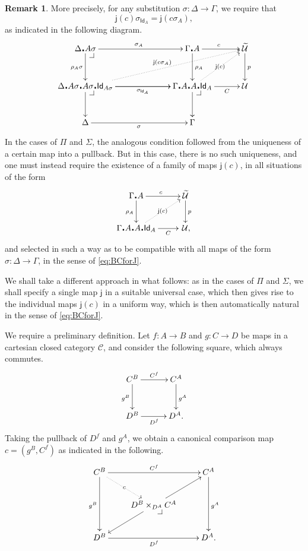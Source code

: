 \documentclass[12pt]{article}
\makeatletter
\newcommand{\pbcorner}[1][dr]{\save*!/#1-1.2pc/#1:(-1,1)@^{|-}\restore}
\newcommand{\G}{\ensuremath{\Gamma}}
\newcommand{\exdot}{\ensuremath{\!\centerdot\!}}
\newcommand{\Id}{\mathsf{Id}}
\newcommand{\jay}{\mathsf{j}}
\newcommand{\U}{\ensuremath{\mathcal{U}}}
\newcommand{\UU}{\ensuremath{\widetilde{\mathcal{U}}}}
\theoremstyle{definition}
\newtheorem{remark}[theorem]{Remark}
\makeatother
\begin{document}
\begin{remark}
More precisely, for any substitution $\sigma :\Delta\to \G$, we require that 
%
\begin{equation}\label{eq:BCforJ}
\jay(c)\sigma_{\Id_{A}} = \jay(c\sigma_{A}),
\end{equation}
%
as indicated in the following diagram.
%
\begin{equation*}%
\xymatrix@=3em{
\Delta\exdot A\sigma \ar[d]_{\rho_A\sigma} \ar[rr]^{\sigma_A} \pbcorner 	&& \G\exdot A \ar[d]^{\rho_A} \ar[r]^c		& \UU \ar[d]^{p} \\
\Delta\exdot A\sigma\exdot A\sigma\exdot\Id_{A\sigma} \ar[rr]_-{\sigma_{\Id_{A}}} \ar@{.>}[urrr]^{\jay(c\sigma_A)} \ar[d] \ar[rr] \pbcorner && \G\exdot A\exdot A\exdot\Id_A \ar@{.>}[ur]|-{\jay(c)} \ar[r]_-C \ar[d] \pbcorner 	& \U \\
\Delta \ar[rr]_\sigma									&& \G				&
}
\end{equation*}
%
In the cases of $\Pi$ and $\Sigma$, the analogous condition followed from the uniqueness of a certain map into a pullback.  But in this case, there is no such uniqueness, and one must instead require the existence of a family of maps $\jay(c)$, in all situations of the form
\begin{equation}\label{diag:Idfill}
\xymatrix{
\G\exdot A \ar[d]_{\rho_A} \ar[r]^c		& \UU \ar[d]^{p} \\
\G\exdot A\exdot A\exdot\Id_A \ar@{.>}[ur]|-{\jay(c)} \ar[r]_-C & \,\U,
}
\end{equation}
and selected in such a way as to be compatible with all maps of the form $\sigma :\Delta\to \G$, in the sense of \eqref{eq:BCforJ}.

We shall take a different approach in what follows: as in the cases of $\Pi$ and $\Sigma$, we shall specify a single map $\jay$ in a suitable universal case, which then gives rise to the individual maps $\jay(c)$ in a uniform way, which is then automatically natural in the sense of \eqref{eq:BCforJ}.
\end{remark}

We require a preliminary definition.
Let $f : A\to B$ and $g : C\to D$ be maps in a  cartesian closed category $\mathcal{C}$, and consider the following square, which always commutes.
\begin{equation}\label{diag:intLLP}
\xymatrix@=3em{
C^B \ar[d]_{g^B} \ar[r]^{C^f} & C^A \ar[d]^{g^A} \\
D^B \ar[r]_{D^f} & D^A.
}
\end{equation}
Taking the pullback of $D^f$ and $g^A$, we obtain a canonical comparison map $c = (g^B, C^f)$ as indicated in the following.
\begin{equation}\label{diag:intLLP2}
\xymatrix{
C^B \ar[dd]_{g^B} \ar[rr]^{C^f} \ar@{.>}[dr]|-{\,c\,} && C^A \ar[dd]^{g^A} \\
& D^B\times_{D^A} C^A \ar[ld] \ar[ru] \pbcorner & \\
D^B \ar[rr]_{D^f} && D^A.
}
\end{equation}
\end{document}
